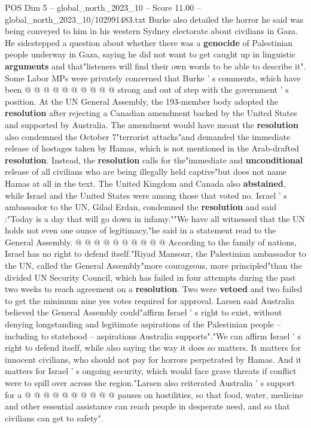 \begin{textsample}{POS Dim 5 – global\_north\_2023\_10 – Score 11.00 – global\_north\_2023\_10/102991483.txt}
Burke also detailed the horror he said was being conveyed to him in his western Sydney electorate about civilians in Gaza.
He sidestepped a question about whether there was a \textbf{genocide} of Palestinian people underway in Gaza, saying he did not want to get caught up in linguistic \textbf{arguments} and that"listeners will find their own words to be able to describe it".
Some Labor MPs were privately concerned that Burke ' s comments, which have been @ @ @ @ @ @ @ @ @ @ strong and out of step with the government ' s position.
At the UN General Assembly, the 193-member body adopted the \textbf{resolution} after rejecting a Canadian amendment backed by the United States and supported by Australia.
The amendment would have meant the \textbf{resolution} also condemned the October 7"terrorist attacks"and demanded the immediate release of hostages taken by Hamas, which is not mentioned in the Arab-drafted \textbf{resolution}.
Instead, the \textbf{resolution} calls for the"immediate and \textbf{unconditional} release of all civilians who are being illegally held captive"but does not name Hamas at all in the text.
The United Kingdom and Canada also \textbf{abstained}, while Israel and the United States were among those that voted no.
Israel ' s ambassador to the UN, Gilad Erdan, condemned the \textbf{resolution} and said :"Today is a day that will go down in infamy.""We have all witnessed that the UN holds not even one ounce of legitimacy,"he said in a statement read to the General Assembly. @ @ @ @ @ @ @ @ @ @ According to the family of nations, Israel has no right to defend itself."Riyad Mansour, the Palestinian ambassador to the UN, called the General Assembly"more courageous, more principled"than the divided UN Security Council, which has failed in four attempts during the past two weeks to reach agreement on a \textbf{resolution}.
Two were \textbf{vetoed} and two failed to get the minimum nine yes votes required for approval.
Larsen said Australia believed the General Assembly could"affirm Israel ' s right to exist, without denying longstanding and legitimate aspirations of the Palestinian people -- including to statehood -- aspirations Australia supports"."We can affirm Israel ' s right to defend itself, while also saying the way it does so matters.
It matters for innocent civilians, who should not pay for horrors perpetrated by Hamas.
And it matters for Israel ' s ongoing security, which would face grave threats if conflict were to spill over across the region."Larsen also reiterated Australia ' s support for a @ @ @ @ @ @ @ @ @ @ pauses on hostilities, so that food, water, medicine and other essential assistance can reach people in desperate need, and so that civilians can get to safety".

\end{textsample}
